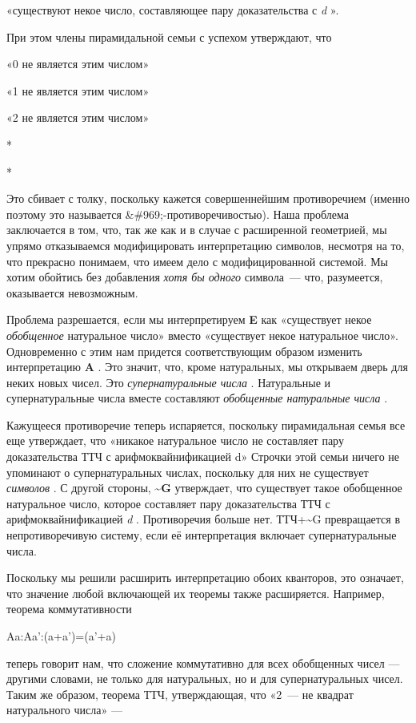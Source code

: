 \documentclass[../main.tex]{subfiles}
\begin{document}
«существуют некое число, составляющее пару доказательства с \emph{d} ».

При этом члены пирамидальной семьи с успехом утверждают, что

«0 не является этим числом»

«1 не является этим числом»

«2 не является этим числом»

*

*

Это сбивает с толку, поскольку кажется совершеннейшим противоречием (именно поэтому это называется \&\#969;-противоречивостью). Наша проблема заключается в том, что, так же как и в случае с расширенной геометрией, мы упрямо отказываемся модифицировать интерпретацию символов, несмотря на то, что прекрасно понимаем, что имеем дело с модифицированной системой. Мы хотим обойтись без добавления \emph{хотя бы одного} символа~--- что, разумеется, оказывается невозможным.

Проблема разрешается, если мы интерпретируем \textbf{E} как «существует некое \emph{обобщенное} натуральное число» вместо «существует некое натуральное число». Одновременно с этим нам придется соответствующим образом изменить интерпретацию \textbf{A} . Это значит, что, кроме натуральных, мы открываем дверь для неких новых чисел. Это \emph{супернатуральные числа} . Натуральные и супернатуральные числа вместе составляют \emph{обобщенные натуральные числа} .

Кажущееся противоречие теперь испаряется, поскольку пирамидальная семья все еще утверждает, что «никакое натуральное число не составляет пару доказательства ТТЧ с арифмоквайнификацией d» Строчки этой семьи ничего не упоминают о супернатуральных числах, поскольку для них не существует \emph{символов} . С другой стороны, \textbf{\textasciitilde G} утверждает, что существует такое обобщенное натуральное число, которое составляет пару доказательства ТТЧ с арифмоквайнификацией \emph{d} . Противоречия больше нет. ТТЧ+\textasciitilde G превращается в непротиворечивую систему, если её интерпретация включает супернатуральные числа.

Поскольку мы решили расширить интерпретацию обоих кванторов, это означает, что значение любой включающей их теоремы также расширяется. Например, теорема коммутативности

Aa:Aa':(a+a')=(a'+a)

теперь говорит нам, что сложение коммутативно для всех обобщенных чисел --- другими словами, не только для натуральных, но и для супернатуральных чисел. Таким же образом, теорема ТТЧ, утверждающая, что «2~--- не квадрат натурального числа» ---
\end{document}
